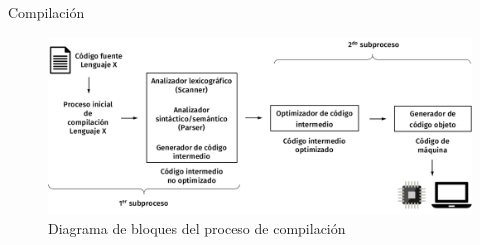 \begin{frame}[fragile]{Compilación}

  \begin{figure}
    \includegraphics[width=1\textwidth]{./resources/compilation_op.png}
    \caption{Diagrama de bloques del proceso de compilación}
   \end{figure}
\end{frame}

